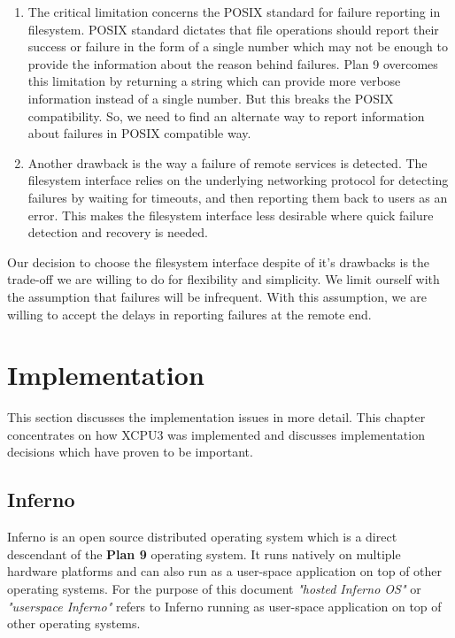 \documentclass[conference]{IEEEtran}
\begin{document}
\begin{enumerate}

\item The critical limitation concerns the POSIX standard for failure
reporting in filesystem.  POSIX standard dictates that file operations should
report their success or failure in the form of a single number which may not be
enough to provide the information about the reason behind failures.  Plan 9
overcomes this limitation by returning a string which can provide more
verbose information instead of a single number.  But this breaks the POSIX
compatibility.  So, we need to find an alternate way to report information
about failures in POSIX compatible way.

\item Another drawback is the way a failure of remote services is detected.
The filesystem interface relies on the underlying networking protocol for
detecting failures by waiting for timeouts, and then reporting them back to
users as an error.  This makes the filesystem interface less desirable where
quick failure detection and recovery is needed.


\end{enumerate}

Our decision to choose the filesystem interface despite of it's drawbacks is the
trade-off we are willing to do for flexibility and simplicity.  We limit
ourself with the assumption that failures will be infrequent.  With this
assumption, we are willing to accept the delays in reporting failures at the
remote end.


\section{Implementation}

This section discusses the implementation issues in more detail.  This chapter
concentrates on how XCPU3 was implemented and discusses implementation
decisions which have proven to be important.


\subsection{Inferno}
Inferno\cite{inferno} is an open source distributed operating system which is a 
direct descendant of the \textbf{Plan 9} operating system.  It runs natively on
multiple hardware platforms and can also run as a user-space application on
top of other operating systems.  For the purpose of this document
\textit{"hosted Inferno OS"} or \textit{"userspace Inferno"} refers to Inferno
running as user-space application on top of other operating systems.
\end{document}
